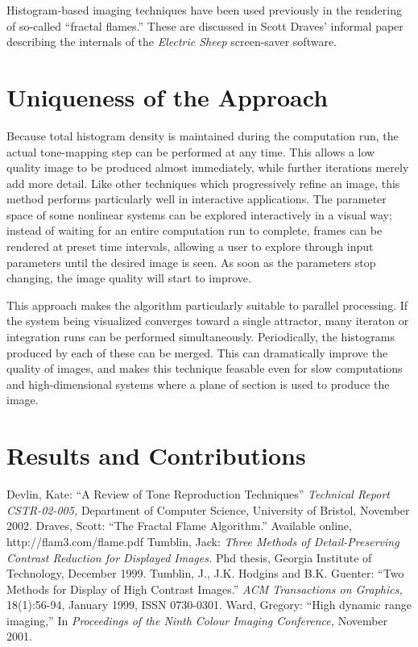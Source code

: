 \documentclass[letterpaper, 11pt]{article}
\begin{document}
Histogram-based imaging techniques have been used previously in the rendering of so-called
``fractal flames.''  These are discussed in Scott Draves' informal paper describing the
internals of the \emph{Electric Sheep} screen-saver software\cite{sd}.

\section{Uniqueness of the Approach}
Because total histogram density is maintained during the computation run, the actual
tone-mapping step can be performed at any time.  This allows a low quality image to
be produced almost immediately, while further iterations merely add more detail.  Like
other techniques which progressively refine an image, this method performs particularly
well in interactive applications.  The parameter space of some nonlinear systems can be
explored interactively in a visual way; instead of waiting for an entire computation run
to complete, frames can be rendered at preset time intervals, allowing a user to explore
through input parameters until the desired image is seen.  As soon as the parameters
stop changing, the image quality will start to improve.

This approach makes the algorithm particularly suitable to parallel processing.  If the
system being visualized converges toward a single attractor, many iteraton or integration
runs can be performed simultaneously.  Periodically, the histograms produced by each
of these can be merged.  This can dramatically improve the quality of images, and makes
this technique feasable even for slow computations and high-dimensional systems where a
plane of section is used to produce the image.

\section{Results and Contributions}

\begin{thebibliography}{77}
 Devlin, Kate: ``A Review of Tone Reproduction Techniques'' {\it Technical Report CSTR-02-005,} Department of Computer Science, University of Bristol, November 2002.
 Draves, Scott: ``The Fractal Flame Algorithm.'' Available online, http://flam3.com/flame.pdf
 Tumblin, Jack: {\it Three Methods of Detail-Preserving Contrast Reduction for Displayed Images.} Phd thesis, Georgia Institute of Technology, December 1999.
 Tumblin, J., J.K. Hodgins and B.K. Guenter: ``Two Methods for Display of High Contrast Images.'' {\it ACM Transactions on Graphics,} 18(1):56-94, January 1999, ISSN 0730-0301.
 Ward, Gregory: ``High dynamic range imaging,'' In {\it Proceedings of the Ninth Colour Imaging Conference,} November 2001.
\end{thebibliography}
\end{document}
